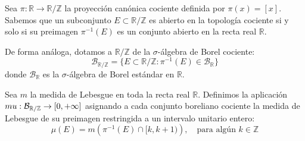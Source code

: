 Sea $\pi: \mathbb{R} \to \mathbb{R}/\mathbb{Z}$ la proyección canónica cociente definida por $\pi(x) = [x]$. 
Sabemos que un subconjunto $E \subset \mathbb{R}/\mathbb{Z}$ es abierto en la topología cociente si y solo si su preimagen $\pi^{-1}(E)$ es un conjunto abierto en la recta real $\mathbb{R}$. 

De forma análoga, dotamos a $\mathbb{R}/\mathbb{Z}$ de la $\sigma$-álgebra de Borel cociente:
$$ \mathcal{B}_{\mathbb{R}/\mathbb{Z}} = \{ E \subset \mathbb{R}/\mathbb{Z} : \pi^{-1}(E) \in \mathcal{B}_\mathbb{R} \} $$
donde $\mathcal{B}_\mathbb{R}$ es la $\sigma$-álgebra de Borel estándar en $\mathbb{R}$.

\begin{definicion}
	Sea $m$ la medida de Lebesgue en toda la recta real $\mathbb{R}$. Definimos la aplicación $\\mu: \mathcal{B}_{\mathbb{R}/\mathbb{Z}} \to [0, +\infty]$ asignando a cada conjunto boreliano cociente la medida de Lebesgue de su preimagen restringida a un intervalo unitario entero:
	$$ \mu(E) = m\left( \pi^{-1}(E) \cap [k, k+1) \right), \quad \text{para algún } k \in \mathbb{Z} $$
\end{definicion}

